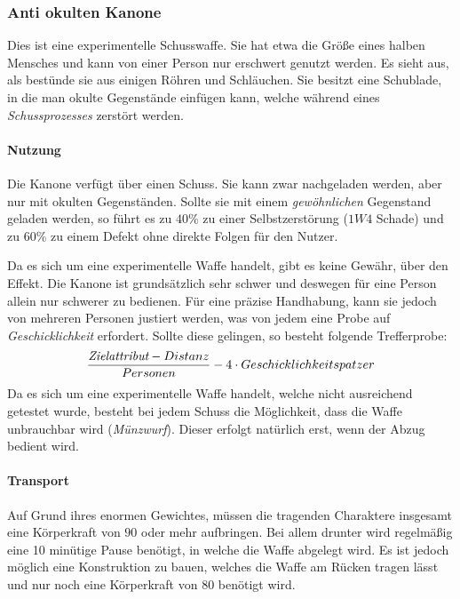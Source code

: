 \subsubsection{Anti okulten Kanone}
    \label{items:anti-okulten-kanone}
    Dies ist eine experimentelle Schusswaffe. Sie hat etwa die Größe eines halben Mensches und kann von einer Person nur erschwert genutzt werden. Es sieht aus, als bestünde sie aus einigen Röhren und Schläuchen. Sie besitzt eine Schublade, in die man okulte Gegenstände einfügen kann, welche während eines \emph{Schussprozesses} zerstört werden. 

    \paragraph{Nutzung}
        Die Kanone verfügt über einen Schuss. Sie kann zwar nachgeladen werden, aber nur mit okulten Gegenständen. Sollte sie mit einem \emph{gewöhnlichen} Gegenstand geladen werden, so führt es zu $40$\% zu einer Selbstzerstörung ($1W4$ Schade) und zu $60$\% zu einem Defekt ohne direkte Folgen für den Nutzer.

        Da es sich um eine experimentelle Waffe handelt, gibt es keine Gewähr, über den Effekt. Die Kanone ist grundsätzlich sehr schwer und deswegen für eine Person allein nur schwerer zu bedienen. Für eine präzise Handhabung, kann sie jedoch von mehreren Personen justiert werden, was von jedem eine Probe auf \emph{Geschicklichkeit} erfordert. Sollte diese gelingen, so besteht folgende Trefferprobe:
        \begin{displaymath}
            \frac{\emph{Zielattribut}-Distanz}{Personen} - 4 \cdot Geschicklichkeitspatzer
        \end{displaymath}
    Da es sich um eine experimentelle Waffe handelt, welche nicht ausreichend getestet wurde, besteht bei jedem Schuss die Möglichkeit, dass die Waffe unbrauchbar wird (\emph{Münzwurf}). Dieser erfolgt natürlich erst, wenn der Abzug bedient wird.
    
    \paragraph{Transport}
        Auf Grund ihres enormen Gewichtes, müssen die tragenden Charaktere insgesamt eine Körperkraft von $90$ oder mehr aufbringen. Bei allem drunter wird regelmäßig eine 10 minütige Pause benötigt, in welche die Waffe abgelegt wird. Es ist jedoch möglich eine Konstruktion zu bauen, welches die Waffe am Rücken tragen lässt und nur noch eine Körperkraft von $80$ benötigt wird.
